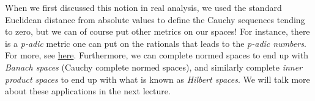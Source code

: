 When we first discussed this notion in real analysis, we used the standard Euclidean distance from absolute values to define the Cauchy sequences tending to zero, but we can of course put other metrics on our spaces! For instance, there is a \textit{p-adic} metric one can put on the rationals that leads to the \textit{p-adic numbers}. For more, see \href{https://en.wikipedia.org/wiki/P-adic_number}{here}. Furthermore, we can complete normed spaces to end up with \textit{Banach spaces} (Cauchy complete normed spaces), and similarly complete \textit{inner product spaces} to end up with what is known as \textit{Hilbert spaces}. We will talk more about these applications in the next lecture.